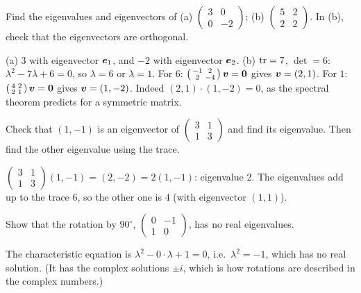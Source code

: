 \begin{exercise}
Find the eigenvalues and eigenvectors of (a) $\left(\begin{smallmatrix} 3 & 0\\
0 & -2\end{smallmatrix}\right)$; (b) $\left(\begin{smallmatrix} 5 & 2\\ 2 &
2\end{smallmatrix}\right)$. In (b), check that the eigenvectors are orthogonal.
\end{exercise}
\begin{solution}
(a) $3$ with eigenvector $\bm{e}_1$, and $-2$ with eigenvector $\bm{e}_2$.
(b) $\operatorname{tr} = 7$, $\det = 6$: $\lambda^2 - 7\lambda + 6 = 0$, so $\lambda = 6$ or
$\lambda = 1$. For $6$: $\left(\begin{smallmatrix} -1 & 2\\ 2 &
-4\end{smallmatrix}\right)\bm{v} = \bm{0}$ gives $\bm{v} = (2, 1)$. For $1$:
$\left(\begin{smallmatrix} 4 & 2\\ 2 & 1\end{smallmatrix}\right)\bm{v} = \bm{0}$
gives $\bm{v} = (1, -2)$. Indeed $(2,1)\cdot(1,-2) = 0$, as the spectral theorem
predicts for a symmetric matrix.
\end{solution}

\begin{exercise}
Check that $(1, -1)$ is an eigenvector of $\left(\begin{smallmatrix} 3 & 1\\ 1
& 3\end{smallmatrix}\right)$ and find its eigenvalue. Then find the other
eigenvalue using the trace.
\end{exercise}
\begin{solution}
$\left(\begin{smallmatrix} 3 & 1\\ 1 & 3\end{smallmatrix}\right)(1, -1) =
(2, -2) = 2(1, -1)$: eigenvalue $2$. The eigenvalues add up to the trace $6$,
so the other one is $4$ (with eigenvector $(1, 1)$).
\end{solution}

\begin{exercise}
Show that the rotation by $90^\circ$,
$\left(\begin{smallmatrix} 0 & -1\\ 1 & 0\end{smallmatrix}\right)$, has no
real eigenvalues.
\end{exercise}
\begin{solution}
The characteristic equation is $\lambda^2 - 0\cdot\lambda + 1 = 0$, i.e.\
$\lambda^2 = -1$, which has no real solution. (It has the complex solutions
$\pm i$, which is how rotations are described in the complex numbers.)
\end{solution}

